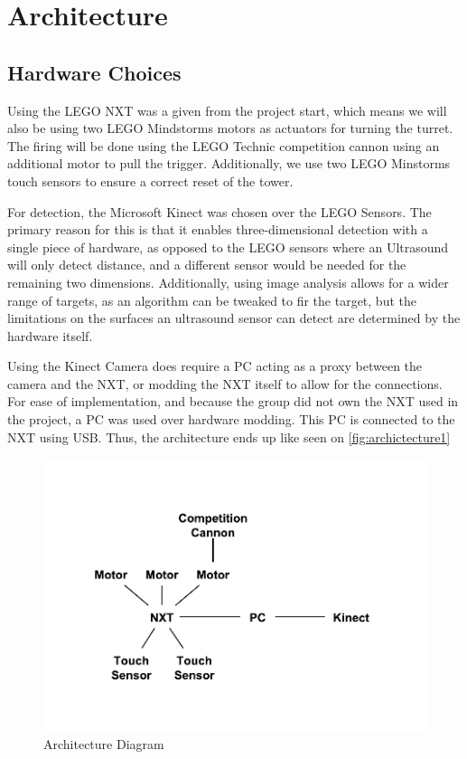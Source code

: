 \section{Architecture}

\subsection{Hardware Choices}

Using the LEGO NXT was a given from the project start, which means we will also be using two LEGO Mindstorms
motors as actuators for turning the turret. The firing will be done using the LEGO Technic competition cannon
using an additional motor to pull the trigger. Additionally, we use two LEGO Minstorms touch sensors to ensure
a correct reset of the tower.

For detection, the Microsoft Kinect was chosen over the LEGO Sensors. The primary reason for this is that
it enables three-dimensional detection with a single piece of hardware, as opposed to the LEGO sensors where
an Ultrasound will only detect distance, and a different sensor would be needed for the remaining two dimensions.
Additionally, using image analysis allows for a wider range of targets, as an algorithm can be tweaked to
fir the target, but the limitations on the surfaces an ultrasound sensor can detect are determined by the
hardware itself.

Using the Kinect Camera does require a PC acting as a proxy between the camera and the NXT, or modding the
NXT itself to allow for the connections. For ease of implementation, and because the group did not own the NXT
used in the project, a PC was used over hardware modding. This PC is connected to the NXT using USB.
Thus, the architecture ends up like seen on \autoref{fig:archictecture1}

\begin{figure}[hbtp]
\includegraphics[width=1\textwidth]{img/architecture1.pdf}
\caption{Architecture Diagram} 
\label{fig:archictecture1} 
\end{figure}

